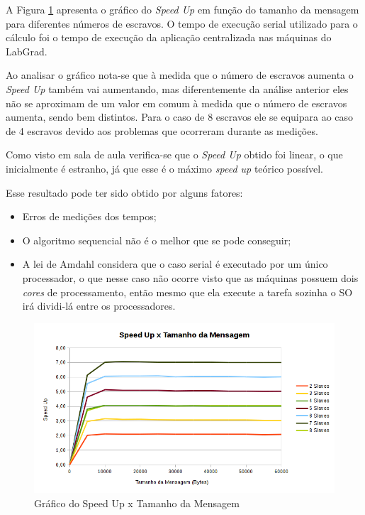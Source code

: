 \documentclass[
	12pt,				%
    oneside,			%
	a4paper,			%
	english,			%
	brazil,				%
	]{abntex2}
\begin{document}
A Figura \ref{fig:dist:speedupXtamanho_msg} apresenta o gráfico do \textit{Speed Up} em função do tamanho da mensagem para diferentes números de escravos. O tempo de execução serial utilizado para o cálculo foi o tempo de execução da aplicação centralizada nas máquinas do LabGrad.

Ao analisar o gráfico nota-se que à medida que o número de escravos aumenta o \textit{Speed Up} também vai aumentando, mas diferentemente da análise anterior eles não se aproximam de um valor em comum à medida que o número de escravos aumenta, sendo bem distintos. Para o caso de 8 escravos ele se equipara ao caso de 4 escravos devido aos problemas que ocorreram durante as medições. 

Como visto em sala de aula verifica-se que o \textit{Speed Up} obtido foi linear, o que inicialmente é estranho, já que 
esse é o máximo \textit{speed up} teórico possível.

Esse resultado pode ter sido obtido por alguns fatores:

\begin{itemize}
	\item Erros de medições dos tempos;
	\item O algoritmo sequencial não é o melhor que se pode conseguir;
	\item A lei de Amdahl considera que o caso serial é executado por um único processador, o que nesse caso não ocorre visto 
	que as máquinas possuem dois \textit{cores} de processamento, então mesmo que ela execute a tarefa sozinha o SO irá 
	dividi-lá entre os processadores.
\end{itemize}

\begin{figure}[!htb]
\centering
\includegraphics[scale=0.65]{figuras/speedup_distribuido.png}
\caption{Gráfico do Speed Up x Tamanho da Mensagem}
\label{fig:dist:speedupXtamanho_msg}
\end{figure}
\end{document}
